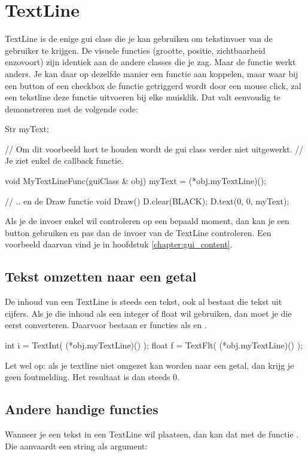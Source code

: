 \chapter{TextLine}
TextLine is de enige gui class die je kan gebruiken om tekstinvoer van de gebruiker te krijgen. De visuele functies (grootte, positie, zichtbaarheid enzovoort) zijn identiek aan de andere classes die je zag. Maar de functie  werkt anders. Je kan daar op dezelfde manier een functie aan koppelen, maar waar bij een button of een checkbox de functie getriggerd wordt door een mouse click, zal een tekstline deze functie uitvoeren bij elke muisklik. Dat valt eenvoudig te demonstreren met de volgende code:

\begin{code}
Str myText;

// Om dit voorbeeld kort te houden wordt de gui class verder niet uitgewerkt.
// Je ziet enkel de callback functie.

void MyTextLineFunc(guiClass & obj) {
  myText = (*obj.myTextLine)();
}

// .. en de Draw functie
void Draw() {
	D.clear(BLACK);
	D.text(0, 0, myText);
}
\end{code}

Als je de invoer enkel wil controleren op een bepaald moment, dan kan je een button gebruiken en pas dan de invoer van de TextLine controleren. Een voorbeeld daarvan vind je in hoofdstuk \ref{chapter:gui_content}.

\section{Tekst omzetten naar een getal}

De inhoud van een TextLine is steeds een tekst, ook al bestaat die tekst uit cijfers. Als je die inhoud als een integer of float wil gebruiken, dan moet je die eerst converteren. Daarvoor bestaan er functies als  en . 

\begin{code}
int   i = TextInt( (*obj.myTextLine)() );
float f = TextFlt( (*obj.myTextLine)() );
\end{code}

Let wel op: als je textline niet omgezet kan worden naar een getal, dan krijg je geen foutmelding. Het resultaat is dan steeds 0.

\section{Andere handige functies}
Wanneer je een tekst in een TextLine wil plaatsen, dan kan dat met de functie . Die aanvaardt een string als argument:

